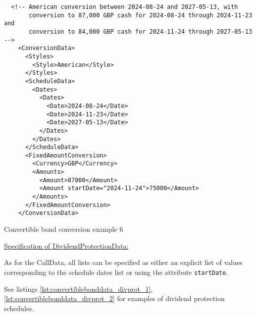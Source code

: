 \begin{listing}[H]
\begin{verbatim}
  <!-- American conversion between 2024-08-24 and 2027-05-13, with
       conversion to 87,000 GBP cash for 2024-08-24 through 2024-11-23 and
       conversion to 84,000 GBP cash for 2024-11-24 through 2027-05-13 -->
    <ConversionData>
      <Styles>
        <Style>American</Style>
      </Styles>
      <ScheduleData>
        <Dates>
          <Dates>
            <Date>2024-08-24</Date>
            <Date>2024-11-23</Date>
            <Date>2027-05-13</Date>
          </Dates>
        </Dates>
      </ScheduleData>
      <FixedAmountConversion>
        <Currency>GBP</Currency>
        <Amounts>
          <Amount>87000</Amount>
          <Amount startDate="2024-11-24">75000</Amount>
        </Amounts>
      </FixedAmountConversion>
    </ConversionData>
\end{verbatim}
\caption{Convertible bond conversion example 6}
\label{lst:convertiblebonddata_conversion_6}
\end{listing}

\underline{Specification of DividendProtectionData:}

As for the CallData, all lists can be specified as either an explicit list of values corresponding to the schedule dates
list or using the attribute \verb+startDate+.

See listings \ref{lst:convertiblebonddata_divprot_1}, \ref{lst:convertiblebonddata_divprot_2}
for examples of dividend protection schedules.

